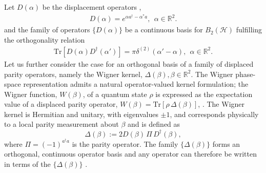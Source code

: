 \documentclass[aps,pra,onecolumn,nofootinbib,superscriptaddress,showpacs]{revtex4}
\begin{document}
Let $D(\alpha)$ be the displacement operators \cite{CahillGlauber19691},
\begin{eqnarray}
D(\alpha)= e^{\alpha a^\dagger - \alpha^* a}, ~~\alpha \in \mathbb R^2.
\end{eqnarray}
and the family of operators $\{D(\alpha)\}$ be a continuous basis for $B_2(\mathcal{H})$ fulfilling the orthogonality relation
\begin{eqnarray}
\mathrm{Tr}[D(\alpha) D^\dagger(\alpha')]
= \pi \delta^{(2)}(\alpha' - \alpha),~~\alpha\in\mathbb R^2.
\end{eqnarray}
Let us further consider the case for an orthogonal basis of a family of displaced parity operators, namely the Wigner kernel, $\Delta(\beta), \beta\in \mathbb R^2$. The Wigner phase-space representation admits a natural operator-valued kernel formulation; the Wigner function, $W(\beta)$, of a quantum state $\rho$ is expressed as the expectation value of a displaced parity operator,
 \(
W(\beta)=\mathrm{Tr}[\rho\,\Delta(\beta)]
\),
\cite{CahillGlauber19692,Royer1977}.
The  Wigner kernel is Hermitian and unitary, with eigenvalues $\pm1$, and corresponds physically to a local parity measurement about $\beta$ and is defined as
\begin{equation}
\Delta(\beta) := 2D(\beta)\,\Pi\,D^\dagger(\beta),
\end{equation}
where $\Pi = (-1)^{a^\dagger a}$ is the parity operator. 
The family $\{\Delta(\beta)\}$ forms an orthogonal, continuous operator basis and any operator can therefore be written in terms of the $\{\Delta(\beta)\}$ \cite{CahillGlauber19692}. 
\end{document}
